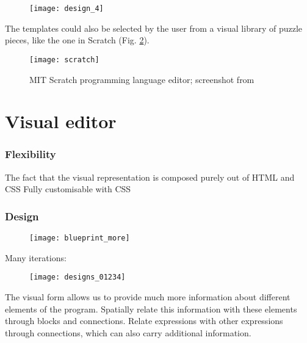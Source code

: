 \begin{figure}[h!]
\centering \texttt{[image: design\_4]}
\caption{}
\label{fig:design_4}
\end{figure}






The templates could also be selected by the user from a visual library of puzzle
pieces, like the one in Scratch (Fig. \ref{fig:scratch}).
\begin{figure}[h!]
\centering \texttt{[image: scratch]}
\caption{
    MIT Scratch programming language editor;
    screenshot from\protect\cite{fig_scratch}
}
\label{fig:scratch}
\end{figure}


\section{Visual editor}






\subsubsection{Flexibility}
The fact that the visual representation is composed purely out of HTML and CSS
Fully customisable with CSS

\subsubsection{Design}
\begin{figure}[h!]
\centering \texttt{[image: blueprint\_more]}
\caption{}
\label{fig:blueprint_more}
\end{figure}

Many iterations:

\begin{figure}[h!]
\centering \texttt{[image: designs\_01234]}
\caption{}
\label{fig:designs_01234}
\end{figure}

The visual form allows us to provide much more information about different
elements of the program. Spatially relate this information with these elements
through blocks and connections. Relate expressions with other expressions
through connections, which can also carry additional information.

